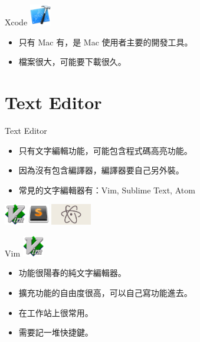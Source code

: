 \documentclass[t]{beamer}
\begin{document}
\begin{frame}{Xcode}
  \vspace{0.5em}
  \hspace{2em}
  \includegraphics[height=2.5em]{xcode.png}
  \vspace{0.5em}
  \begin{itemize}
    \item 只有 Mac 有，是 Mac 使用者主要的開發工具。
    \item 檔案很大，可能要下載很久。
  \end{itemize}
\end{frame}

\section{Text Editor}
\begin{frame}{Text Editor}
  \begin{itemize}
    \item 只有文字編輯功能，可能包含程式碼高亮功能。
    \item 因為沒有包含編譯器，編譯器要自己另外裝。
    \item 常見的文字編輯器有：Vim, Sublime Text, Atom
  \end{itemize}
  \begin{center}
    \includegraphics[height=2.5em]{vim.png}
    \hspace{1em}
    \includegraphics[height=2.5em]{st.png}
    \hspace{1em}
    \includegraphics[height=2.5em]{atom.png}
  \end{center}
\end{frame}

\begin{frame}{Vim}
  \vspace{0.5em}
  \hspace{2em}
  \includegraphics[height=2.5em]{vim.png}
  \vspace{0.5em}
  \begin{itemize}
    \item 功能很陽春的純文字編輯器。
    \item 擴充功能的自由度很高，可以自己寫功能進去。
    \item 在工作站上很常用。
    \item 需要記一堆快捷鍵。
  \end{itemize} 
\end{frame}
\end{document}
